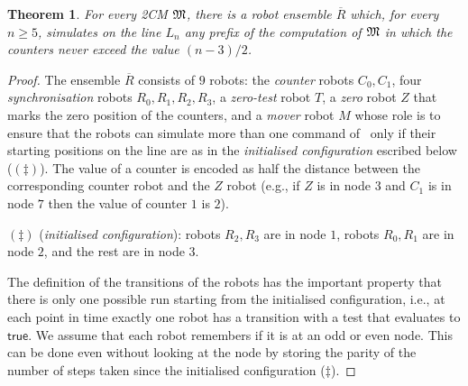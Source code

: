 \documentclass{llncs}
\newtheorem{theorem}{Theorem}
\newcommand{\tup}[1]{\overline{#1}}
\def\true{\textsf{true}}
\newcommand{\sr}[1]{\footnote{{\color{red} Note. #1}}}
\renewcommand{\sr}[1]{}
\newcommand{\mover}{\ensuremath{M}}
\newcommand{\round}{\ensuremath{R}}
\newcommand{\zero}{\ensuremath{Z}}
\newcommand{\zeroTest}{\ensuremath{T}}
\newcommand{\counter}{\ensuremath{C}}
\begin{document}
\begin{theorem} \label{thm:PVPundec}
For every 2CM $\mathfrak{M}$, there is a robot ensemble $\tup{R}$ which, for every $n \geq 5$, simulates on the line $L_n$ any prefix of the computation of $\mathfrak{M}$ in which the counters never exceed the value $(n-3)/2$.\sr{can we more clearly say what we mean by ``simulates''? }
\end{theorem}
\begin{proof}
The ensemble $\tup{R}$ consists of $9$ robots: the {\em counter} robots $\counter_0, \counter_1$, four {\em synchronisation} robots $\round_0,\round_1,\round_2,\round_3$, a {\em zero-test} robot $\zeroTest$, a {\em zero} robot $\zero$ that marks the zero position of the counters, and a {\em mover} robot $\mover$ whose role is to ensure that the robots can simulate more than one command of \cm\ only if their starting positions on the line are as in the {\em initialised configuration} escribed below ($(\ddagger)$). The value of a counter is encoded as half the distance between the corresponding counter robot and the $\zero$ robot (e.g., if $\zero$ is in node $3$ and $\counter_1$ is in node $7$ then the value of counter $1$ is $2$).


$(\ddagger)$ ({\em initialised configuration}):
robots $\round_2, \round_3$ are in node $1$, robots $\round_0,\round_1$ are in node $2$, and the rest are in node $3$.

The definition of the transitions of the robots has the important property that there is only one possible run starting from the initialised configuration, i.e., at each point in time exactly one robot has a transition with a test that evaluates to $\true$. We assume that each robot remembers if it is at an odd or even node. This can be done even without looking at the node by storing the parity of the number of steps taken since the initialised configuration ($\ddagger$).


\end{proof}
\end{document}
